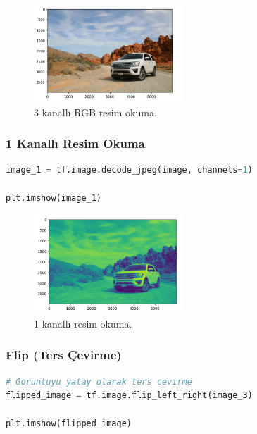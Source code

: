\newpage

\begin{figure}[ht]
    \centering
    \includegraphics[width=0.5\textwidth]{images/image_aug_02.png}
    \caption{3 kanallı RGB resim okuma.}
    \label{fig:enter-label}
\end{figure}

\subsubsection{1 Kanallı Resim Okuma}

\begin{lstlisting}[language=Python]
image_1 = tf.image.decode_jpeg(image, channels=1)

plt.imshow(image_1)
\end{lstlisting}

\begin{figure}[h]
    \centering
    \includegraphics[width=0.5\textwidth]{images/image_aug_03.png}
    \caption{1 kanallı resim okuma.}
    \label{fig:enter-label}
\end{figure}

\subsubsection{Flip (Ters Çevirme)}

\begin{lstlisting}[language=Python]
# Goruntuyu yatay olarak ters cevirme
flipped_image = tf.image.flip_left_right(image_3)

plt.imshow(flipped_image)
\end{lstlisting}


